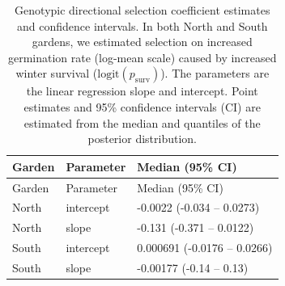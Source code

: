 \documentclass[
  12pt,
]{article}
\begin{document}
\begin{longtable}[]{@{}lll@{}}
\caption{\label{tab:df_ind_lm} Genotypic directional selection coefficient estimates and confidence intervals. In both North and South gardens, we estimated selection on increased germination rate (log-mean scale) caused by increased winter survival (\(\text{logit}(p_\text{surv})\)). The parameters are the linear regression slope and intercept. Point estimates and 95\% confidence intervals (CI) are estimated from the median and quantiles of the posterior distribution.}\tabularnewline
\toprule
Garden & Parameter & Median (95\% CI) \\
\midrule
\endfirsthead
\toprule
Garden & Parameter & Median (95\% CI) \\
\midrule
\endhead
North & intercept & -0.0022 (-0.034 -- 0.0273) \\
North & slope & -0.131 (-0.371 -- 0.0122) \\
South & intercept & 0.000691 (-0.0176 -- 0.0266) \\
South & slope & -0.00177 (-0.14 -- 0.13) \\
\bottomrule
\end{longtable}

\clearpage
\end{document}
